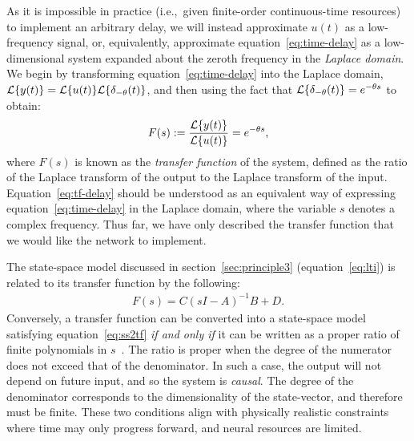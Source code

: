 \documentclass[12pt]{article}
\theoremstyle{definition}
\let\originalleft\left
\let\originalright\right
\renewcommand{\left}{\mathopen{}\mathclose\bgroup\originalleft}
\renewcommand{\right}{\aftergroup\egroup\originalright}
\begin{document}
As it is impossible in practice (i.e.,~given finite-order continuous-time resources) to implement an arbitrary delay, we will instead approximate $u(t)$ as a low-frequency signal, or, equivalently, approximate equation~\ref{eq:time-delay} as a low-dimensional system expanded about the zeroth frequency in the \emph{Laplace domain}.
We begin by transforming equation~\ref{eq:time-delay} into the Laplace domain, $\mathcal{L} \left\{ y(t) \right\} = \mathcal{L} \left\{ u(t) \right\} \mathcal{L} \left\{ \delta_{-\theta}(t) \right\}$, and then using the fact that $\mathcal{L} \left\{ \delta_{-\theta}(t) \right\} = e^{-\theta s}$ to obtain:
\begin{align} \label{eq:tf-delay}
F(s) := \frac{\mathcal{L} \left\{ y(t) \right\}}{\mathcal{L} \left\{ u(t) \right\}} = e^{-\theta s} \text{,}
\end{align}
where $F(s)$ is known as the \emph{transfer function} of the system, defined as the ratio of the Laplace transform of the output to the Laplace transform of the input.
Equation~\ref{eq:tf-delay} should be understood as an equivalent way of expressing equation~\ref{eq:time-delay} in the Laplace domain, where the variable $s$ denotes a complex frequency. 
Thus far, we have only described the transfer function that we would like the network to implement. %

The state-space model discussed in section~\ref{sec:principle3} (equation~\ref{eq:lti}) is related to its transfer function by the following:
\begin{align} \label{eq:ss2tf}
F(s) = C(sI - A)^{-1}B + D \text{.}
\end{align}
Conversely, a transfer function can be converted into a state-space model satisfying equation~\ref{eq:ss2tf} \emph{if and only if} it can be written as a proper ratio of finite polynomials in $s$~\citep{brogan1982modern}.
The ratio is proper when the degree of the numerator does not exceed that of the denominator.
In such a case, the output will not depend on future input, and so the system is \emph{causal}.
The degree of the denominator corresponds to the dimensionality of the state-vector, and therefore must be finite.
These two conditions align with physically realistic constraints where time may only progress forward, and neural resources are limited.
\end{document}
